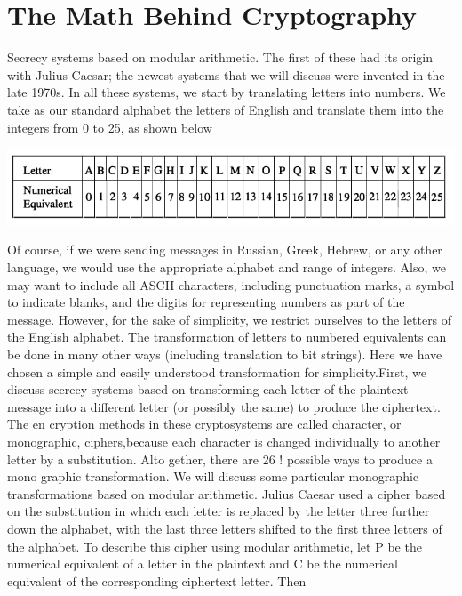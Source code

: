 \documentclass{report}
\begin{document}
{{\section{The Math Behind Cryptography}
\Large{Secrecy systems based on modular arithmetic. The first of these
had its origin with Julius Caesar; the newest systems that we will discuss were invented
in the late 1970s. In all these systems, we start by translating letters into numbers. We
take as our standard alphabet the letters of English and translate them into the integers
from 0 to 25, as shown below}
\begin{center}

\includegraphics[scale=0.5]{"table.png"}
\end{center}

\Large{Of course, if we were sending messages in Russian, Greek, Hebrew, or any other
language, we would use the appropriate alphabet and range of integers. Also, we may
want to include all ASCII characters, including punctuation marks, a symbol to indicate
blanks, and the digits for representing numbers as part of the message. However, for
the sake of simplicity, we restrict ourselves to the letters of the English alphabet. The
transformation of letters to numbered equivalents can be done in many other ways
(including translation to bit strings). Here we have chosen a simple and easily understood
transformation for simplicity.First, we discuss secrecy systems based on transforming each letter of the plaintext
message into a different letter (or possibly the same) to produce the ciphertext. The en­
cryption methods in these cryptosystems are called character, or monographic, ciphers,because each character is changed individually to another letter by a substitution. Alto­
gether, there are 26 ! possible ways to produce a mono graphic transformation. We will
discuss some particular monographic transformations based on modular arithmetic.
Julius Caesar used a cipher based on the substitution in which each letter is replaced
by the letter three further down the alphabet, with the last three letters shifted to the first
three letters of the alphabet. To describe this cipher using modular arithmetic, let P be
the numerical equivalent of a letter in the plaintext and C be the numerical equivalent of
the corresponding ciphertext letter. Then

}}}
\end{document}
